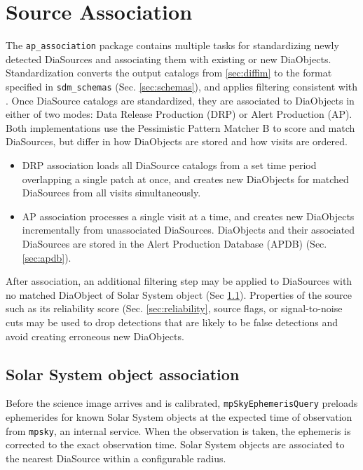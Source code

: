 \section{Source Association}
\label{sec:association}

The \texttt{ap\_association} package contains multiple tasks for standardizing newly detected DiaSources and associating them with existing or new DiaObjects.
Standardization converts the output catalogs from \ref{sec:diffim} to the format specified in \texttt{sdm\_schemas} (Sec. \ref{sec:schemas}), and applies filtering consistent with \citep{DMTN-199}.
Once DiaSource catalogs are standardized, they are associated to DiaObjects in either of two modes: Data Release Production (DRP) or Alert Production (AP).
Both implementations use the Pessimistic Pattern Matcher B \citep{DMTN-031} to score and match DiaSources, but differ in how DiaObjects are stored and how visits are ordered.

\begin{itemize}
\item DRP association loads all DiaSource catalogs from a set time period overlapping a single patch at once, and creates new DiaObjects for matched DiaSources from all visits simultaneously.
\item AP association processes a single visit at a time, and creates new DiaObjects incrementally from unassociated DiaSources.
DiaObjects and their associated DiaSources are stored in the Alert Production Database (APDB) (Sec. \ref{sec:apdb}).
\end{itemize}

After association, an additional filtering step may be applied to DiaSources with no matched DiaObject of Solar System object (Sec \ref{sec:solar}).
Properties of the source such as its reliability score (Sec. \ref{sec:reliability}, source flags, or signal-to-noise cuts may be used to drop detections that are likely to be false detections and avoid creating erroneous new DiaObjects.

\subsection{Solar System object association}
\label{sec:solar}

Before the science image arrives and is calibrated, \texttt{mpSkyEphemerisQuery} preloads ephemerides for known Solar System objects at the expected time of observation from \texttt{mpsky}, an internal service.
When the observation is taken, the ephemeris is corrected to the exact observation time.
Solar System objects are associated to the nearest DiaSource within a configurable radius.

